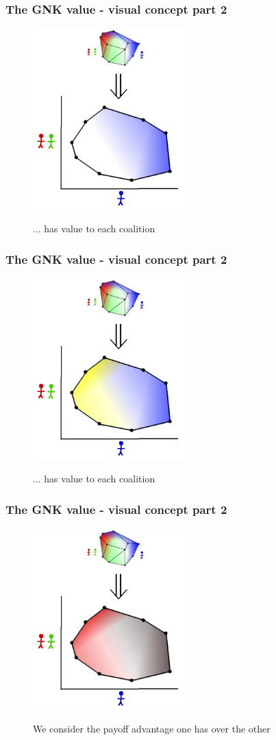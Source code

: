 \begin{frame} \frametitle{The GNK value - visual concept part 2} \begin{figure} \begin{center} \includegraphics[height=7cm]{figs/pa4} \end{center} ... has value to each coalition \end{figure} \end{frame}
\begin{frame} \frametitle{The GNK value - visual concept part 2} \begin{figure} \begin{center} \includegraphics[height=7cm]{figs/pa5} \end{center} ... has value to each coalition \end{figure} \end{frame}
\begin{frame} \frametitle{The GNK value - visual concept part 2} \begin{figure} \begin{center} \includegraphics[height=7cm]{figs/pa6} \end{center} We consider the payoff advantage one has over the other \end{figure} \end{frame}
